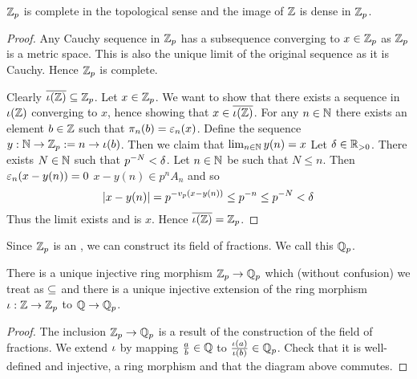 \begin{prop}
    $\mathbb{Z}_p$ is complete in the topological sense
    and the image of $\mathbb{Z}$ is dense in $\mathbb{Z}_p$.
\end{prop}
\begin{proof}
    Any Cauchy sequence in $\mathbb{Z}_p$ has a
    subsequence converging to $x \in \mathbb{Z}_p$
    as $\mathbb{Z}_p$ is a  metric space.
    This is also the unique limit of the original sequence 
    as it is Cauchy.
    Hence $\mathbb{Z}_p$ is complete.

    Clearly $\overline{\iota(\mathbb{Z})} \subseteq \mathbb{Z}_p$.
    Let $x \in \mathbb{Z}_p$. 
    We want to show that there exists a sequence
    in $\iota(\mathbb{Z})$ converging to $x$, 
    hence showing that $x \in \overline{\iota(\mathbb{Z})}$.
    For any $n \in \mathbb{N}$ there exists an element 
    $b \in \mathbb{Z}$ such that $\pi_n(b) = \varepsilon_n(x)$.
    Define the sequence $y: \mathbb{N} \to \mathbb{Z}_p := n \to \iota(b)$.
    Then we claim that $\lim_{n \in \mathbb{N}} y(n) = x$
    Let $\delta \in \mathbb{R}_{>0}$. 
    There exists $N \in \mathbb{N}$ such that $p^{-N}<\delta$.
    Let $n \in \mathbb{N}$ be such that $N \le n$.
    Then $\varepsilon_n(x - y(n)) = 0$ 
    $x - y(n) \in p^n A_n$  
    and so 
    \[\left\vert x - y(n) \right\vert = p^{-v_p(x - y(n))} \le p^{-n}
    \le p^{-N} < \delta\]
    Thus the limit exists and is $x$.
    Hence $\overline{\iota(\mathbb{Z})} = \mathbb{Z}_p$.
\end{proof}

\begin{dfn}[$\Q_p$]
    Since $\mathbb{Z}_p$ is an 
    ,
    we can construct its field of fractions.
    We call this $\Q_p$.
\end{dfn}

\begin{prop}
    There is a unique injective ring morphism $\mathbb{Z}_p \to \mathbb{Q}_p$
    which (without confusion) we treat as $\subseteq$
    and there is a unique injective extension of the ring morphism 
    $\iota : \mathbb{Z} \to \mathbb{Z}_p$ to $\mathbb{Q} \to \mathbb{Q}_p$.
    \begin{center}
    \end{center}
\end{prop}
\begin{proof}
    The inclusion $\mathbb{Z}_p \to \mathbb{Q}_p$ is a result
    of the construction of the field of fractions.
    We extend $\iota$ by mapping $\frac{a}{b} \in \mathbb{Q}$ to
    $\frac{\iota(a)}{\iota(b)} \in \mathbb{Q}_p$.
    Check that it is well-defined and injective,
    a ring morphism and that the diagram above commutes.
\end{proof}

